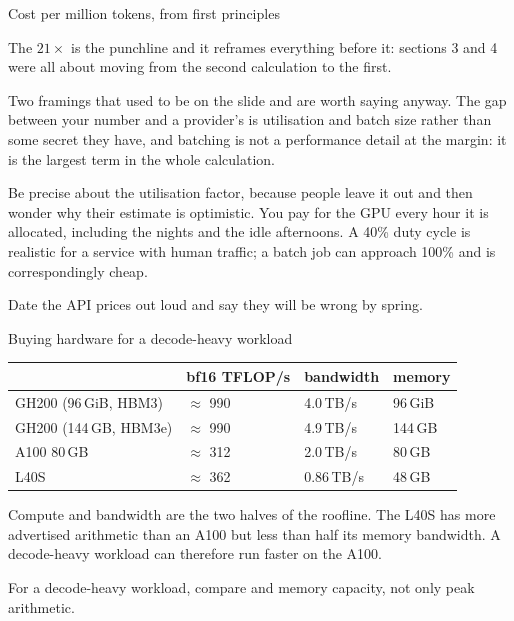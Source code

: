 \documentclass[aspectratio=169,10pt]{beamer}
\begin{document}
\begin{frame}{Cost per million tokens, from first principles}
{  The $21\times$ is the punchline and it reframes everything before it:
  sections 3 and 4 were all about moving from the second calculation to the
  first.

  Two framings that used to be on the slide and are worth saying anyway. The
  gap between your number and a provider's is utilisation and batch size
  rather than some secret they have, and batching is not a performance detail
  at the margin: it is the largest term in the whole calculation.

  Be precise about the utilisation factor, because people leave it out and then
  wonder why their estimate is optimistic. You pay for the GPU every hour it is
  allocated, including the nights and the idle afternoons. A 40\% duty cycle is
  realistic for a service with human traffic; a batch job can approach 100\%
  and is correspondingly cheap.

  Date the API prices out loud and say they will be wrong by spring.}
\end{frame}

\begin{frame}{Buying hardware for a decode-heavy workload}
  \centering
  \begin{tabular}{@{}L{3.6cm} R{2.4cm} R{2.4cm} R{2.4cm}@{}}
    \toprule
    & \textbf{bf16 TFLOP/s} & \textbf{bandwidth} & \textbf{memory}\\
    \midrule
    GH200 (96\,GiB, HBM3)  & $\approx$ 990 & 4.0\,TB/s & 96\,GiB\\
    GH200 (144\,GB, HBM3e) & $\approx$ 990 & 4.9\,TB/s & 144\,GB\\
    A100 80\,GB            & $\approx$ 312 & 2.0\,TB/s & 80\,GB\\
    L40S                   & $\approx$ 362 & 0.86\,TB/s & 48\,GB\\
    \bottomrule
  \end{tabular}

  \vspace{0.4em}
  \raggedright
  \small
  Compute and bandwidth are the two halves of the roofline. The L40S has more
  advertised arithmetic than an A100 but less than half its memory bandwidth.
  A decode-heavy workload can therefore run faster on the A100.
  \vfill
  \begin{takeaway}
    For a decode-heavy workload, compare  and memory
    capacity, not only peak arithmetic.
  \end{takeaway}
\end{frame}
\end{document}
